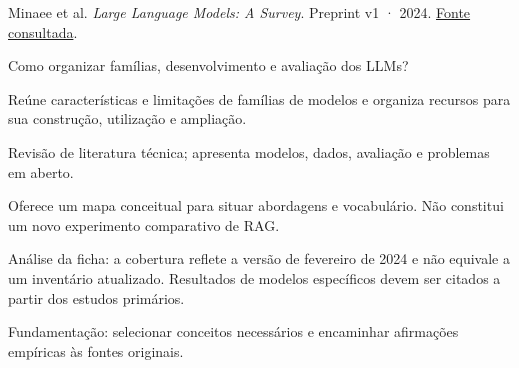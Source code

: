 {\small Minaee et al. \textit{Large Language Models: A Survey}. Preprint v1 · 2024. \href{https://arxiv.org/pdf/2402.06196v1}{Fonte consultada}.\par}

Como organizar famílias, desenvolvimento e avaliação dos LLMs?

Reúne características e limitações de famílias de modelos e organiza recursos para sua construção, utilização e ampliação.

Revisão de literatura técnica; apresenta modelos, dados, avaliação e problemas em aberto.

Oferece um mapa conceitual para situar abordagens e vocabulário. Não constitui um novo experimento comparativo de RAG.

\begin{itemize}
\end{itemize}

Análise da ficha: a cobertura reflete a versão de fevereiro de 2024 e não equivale a um inventário atualizado. Resultados de modelos específicos devem ser citados a partir dos estudos primários.

Fundamentação: selecionar conceitos necessários e encaminhar afirmações empíricas às fontes originais.

